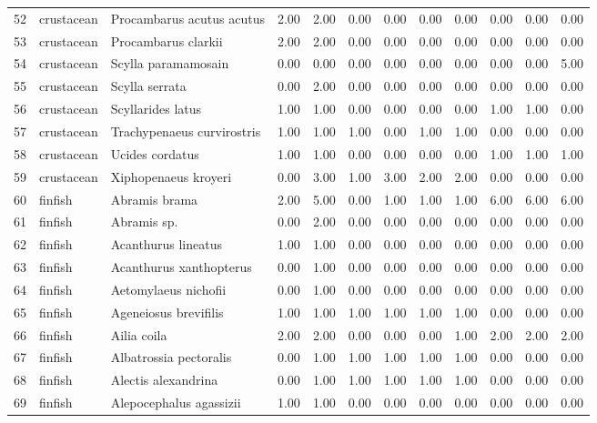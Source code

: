 \begin{table}[ht]
\begin{tabular}{rllrrrrrrrrr}
  52 & crustacean & Procambarus acutus acutus & 2.00 & 2.00 & 0.00 & 0.00 & 0.00 & 0.00 & 0.00 & 0.00 & 0.00 \\ 
  53 & crustacean & Procambarus clarkii & 2.00 & 2.00 & 0.00 & 0.00 & 0.00 & 0.00 & 0.00 & 0.00 & 0.00 \\ 
  54 & crustacean & Scylla paramamosain & 0.00 & 0.00 & 0.00 & 0.00 & 0.00 & 0.00 & 0.00 & 0.00 & 5.00 \\ 
  55 & crustacean & Scylla serrata & 0.00 & 2.00 & 0.00 & 0.00 & 0.00 & 0.00 & 0.00 & 0.00 & 0.00 \\ 
  56 & crustacean & Scyllarides latus & 1.00 & 1.00 & 0.00 & 0.00 & 0.00 & 0.00 & 1.00 & 1.00 & 0.00 \\ 
  57 & crustacean & Trachypenaeus curvirostris & 1.00 & 1.00 & 1.00 & 0.00 & 1.00 & 1.00 & 0.00 & 0.00 & 0.00 \\ 
  58 & crustacean & Ucides cordatus & 1.00 & 1.00 & 0.00 & 0.00 & 0.00 & 0.00 & 1.00 & 1.00 & 1.00 \\ 
  59 & crustacean & Xiphopenaeus kroyeri & 0.00 & 3.00 & 1.00 & 3.00 & 2.00 & 2.00 & 0.00 & 0.00 & 0.00 \\ 
  60 & finfish & Abramis brama & 2.00 & 5.00 & 0.00 & 1.00 & 1.00 & 1.00 & 6.00 & 6.00 & 6.00 \\ 
  61 & finfish & Abramis sp. & 0.00 & 2.00 & 0.00 & 0.00 & 0.00 & 0.00 & 0.00 & 0.00 & 0.00 \\ 
  62 & finfish & Acanthurus lineatus & 1.00 & 1.00 & 0.00 & 0.00 & 0.00 & 0.00 & 0.00 & 0.00 & 0.00 \\ 
  63 & finfish & Acanthurus xanthopterus & 0.00 & 1.00 & 0.00 & 0.00 & 0.00 & 0.00 & 0.00 & 0.00 & 0.00 \\ 
  64 & finfish & Aetomylaeus nichofii & 0.00 & 1.00 & 0.00 & 0.00 & 0.00 & 0.00 & 0.00 & 0.00 & 0.00 \\ 
  65 & finfish & Ageneiosus brevifilis & 1.00 & 1.00 & 1.00 & 1.00 & 1.00 & 1.00 & 0.00 & 0.00 & 0.00 \\ 
  66 & finfish & Ailia coila & 2.00 & 2.00 & 0.00 & 0.00 & 0.00 & 1.00 & 2.00 & 2.00 & 2.00 \\ 
  67 & finfish & Albatrossia pectoralis & 0.00 & 1.00 & 1.00 & 1.00 & 1.00 & 1.00 & 0.00 & 0.00 & 0.00 \\ 
  68 & finfish & Alectis alexandrina & 0.00 & 1.00 & 1.00 & 1.00 & 1.00 & 1.00 & 0.00 & 0.00 & 0.00 \\ 
  69 & finfish & Alepocephalus agassizii & 1.00 & 1.00 & 0.00 & 0.00 & 0.00 & 0.00 & 0.00 & 0.00 & 0.00 \\ 

\end{tabular}
\end{table}
